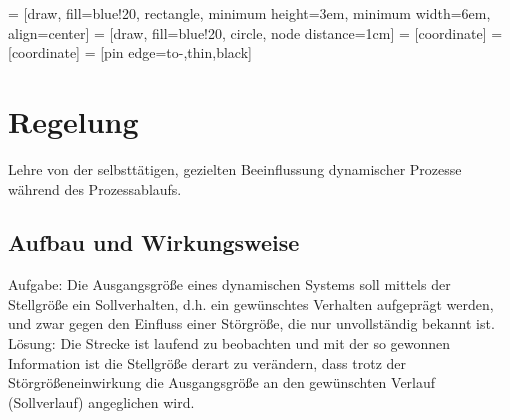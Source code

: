 

 = [draw, fill=blue!20, rectangle, 
    minimum height=3em, minimum width=6em, align=center]
 = [draw, fill=blue!20, circle, node distance=1cm]
 = [coordinate]
 = [coordinate]
 = [pin edge={to-,thin,black}]

\section{Regelung}
Lehre von der selbsttätigen, gezielten Beeinflussung dynamischer Prozesse während des Prozessablaufs.

\subsection{Aufbau und Wirkungsweise}
Aufgabe: Die Ausgangsgröße eines dynamischen Systems soll mittels der Stellgröße ein Sollverhalten, d.h. ein
gewünschtes Verhalten aufgeprägt werden, und zwar gegen den Einfluss einer Störgröße, die nur unvollständig bekannt
ist.\\

Lösung: Die Strecke ist laufend zu beobachten und mit der so gewonnen Information ist die Stellgröße derart zu
verändern, dass trotz der Störgrößeneinwirkung die Ausgangsgröße an den gewünschten Verlauf (Sollverlauf)
angeglichen wird.\\

\\

